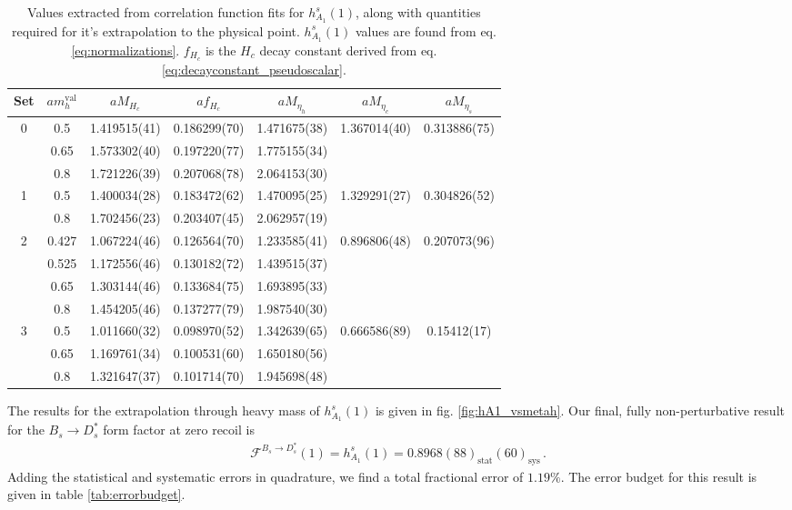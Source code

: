 \begin{table}
  \begin{center}
    \begin{tabular}{ c c c c c c c }
      \hline
      Set & $am_h^{\text{val}}$ & $aM_{H_c}$& $af_{H_c}$& $aM_{\eta_h}$& $aM_{\eta_c}$& $aM_{\eta_s}$\\ [0.5ex]
      \hline
      0 & 0.5 & 1.419515(41) & 0.186299(70) & 1.471675(38) & 1.367014(40) & 0.313886(75)\\ [0.5ex]
      & 0.65 & 1.573302(40) & 0.197220(77) & 1.775155(34) & & \\ [0.5ex]
      & 0.8 & 1.721226(39) & 0.207068(78) & 2.064153(30) & & \\ [0.5ex]
      \hline
      1 & 0.5 & 1.400034(28) & 0.183472(62) & 1.470095(25) & 1.329291(27) & 0.304826(52)\\ [0.5ex]
      & 0.8 & 1.702456(23) & 0.203407(45) & 2.062957(19) & & \\ [0.5ex]
      \hline
      2 & 0.427 & 1.067224(46) & 0.126564(70) & 1.233585(41) & 0.896806(48) & 0.207073(96)\\ [0.5ex]
      & 0.525 & 1.172556(46) & 0.130182(72) & 1.439515(37) & & \\ [0.5ex]
      & 0.65 & 1.303144(46) & 0.133684(75) & 1.693895(33) & & \\ [0.5ex]
      & 0.8 & 1.454205(46) & 0.137277(79) & 1.987540(30) & & \\ [0.5ex]
      \hline
      3 & 0.5 & 1.011660(32) & 0.098970(52) & 1.342639(65) & 0.666586(89) & 0.15412(17)\\ [0.5ex]
      & 0.65 & 1.169761(34) & 0.100531(60) & 1.650180(56) & & \\ [0.5ex]
      & 0.8 & 1.321647(37) & 0.101714(70) & 1.945698(48) & & \\ [0.5ex]
      \hline
    \end{tabular}
    \caption{Values extracted from correlation function fits for $h^s_{A_1}(1)$, along with quantities required for it's extrapolation to the physical point. $h^s_{A_1}(1)$ values are found from eq. \eqref{eq:normalizations}. $f_{H_c}$  is the $H_c$ decay constant derived from eq. \eqref{eq:decayconstant_pseudoscalar}. \label{tab:results2} }
  \end{center}
\end{table}

The results for the extrapolation through heavy mass of $h_{A_1}^s(1)$ is given in fig. \ref{fig:hA1_vsmetah}. Our final, fully non-perturbative result for the $B_s\to D_s^*$ form factor at zero recoil is
\begin{align}
  \mathcal{F}^{B_s\to D_s^*}(1) = h^s_{A_1}(1) = 0.8968(88)_{\text{stat}}(60)_{\text{sys}}\,.
  \label{eq:finalresult}
\end{align}
Adding the statistical and systematic errors in quadrature, we find a total fractional error of $1.19\%$. The error budget for this result is given in table \ref{tab:errorbudget}.

